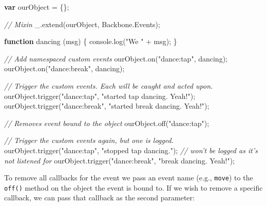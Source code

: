 \documentclass[9pt]{book}
\newenvironment{Shaded}{}{}
\newcommand{\KeywordTok}[1]{\textcolor[rgb]{0.00,0.44,0.13}{\textbf{{#1}}}}
\newcommand{\StringTok}[1]{\textcolor[rgb]{0.25,0.44,0.63}{{#1}}}
\newcommand{\CommentTok}[1]{\textcolor[rgb]{0.38,0.63,0.69}{\textit{{#1}}}}
\newcommand{\OtherTok}[1]{\textcolor[rgb]{0.00,0.44,0.13}{{#1}}}
\newcommand{\FunctionTok}[1]{\textcolor[rgb]{0.02,0.16,0.49}{{#1}}}
\newcommand{\NormalTok}[1]{{#1}}
\begin{document}
\begin{Shaded}
\begin{Highlighting}[]
\KeywordTok{var} \NormalTok{ourObject = \{\};}

\CommentTok{// Mixin}
\OtherTok{_}\NormalTok{.}\FunctionTok{extend}\NormalTok{(ourObject, }\OtherTok{Backbone}\NormalTok{.}\FunctionTok{Events}\NormalTok{);}

\KeywordTok{function} \FunctionTok{dancing} \NormalTok{(msg) \{ }\OtherTok{console}\NormalTok{.}\FunctionTok{log}\NormalTok{(}\StringTok{"We "} \NormalTok{+ msg); \}}

\CommentTok{// Add namespaced custom events}
\OtherTok{ourObject}\NormalTok{.}\FunctionTok{on}\NormalTok{(}\StringTok{"dance:tap"}\NormalTok{, dancing);}
\OtherTok{ourObject}\NormalTok{.}\FunctionTok{on}\NormalTok{(}\StringTok{"dance:break"}\NormalTok{, dancing);}

\CommentTok{// Trigger the custom events. Each will be caught and acted upon.}
\OtherTok{ourObject}\NormalTok{.}\FunctionTok{trigger}\NormalTok{(}\StringTok{"dance:tap"}\NormalTok{, }\StringTok{"started tap dancing. Yeah!"}\NormalTok{);}
\OtherTok{ourObject}\NormalTok{.}\FunctionTok{trigger}\NormalTok{(}\StringTok{"dance:break"}\NormalTok{, }\StringTok{"started break dancing. Yeah!"}\NormalTok{);}

\CommentTok{// Removes event bound to the object}
\OtherTok{ourObject}\NormalTok{.}\FunctionTok{off}\NormalTok{(}\StringTok{"dance:tap"}\NormalTok{);}

\CommentTok{// Trigger the custom events again, but one is logged.}
\OtherTok{ourObject}\NormalTok{.}\FunctionTok{trigger}\NormalTok{(}\StringTok{"dance:tap"}\NormalTok{, }\StringTok{"stopped tap dancing."}\NormalTok{); }\CommentTok{// won't be logged as it's not listened for}
\OtherTok{ourObject}\NormalTok{.}\FunctionTok{trigger}\NormalTok{(}\StringTok{"dance:break"}\NormalTok{, }\StringTok{"break dancing. Yeah!"}\NormalTok{);}
\end{Highlighting}
\end{Shaded}

To remove all callbacks for the event we pass an event name (e.g.,
\texttt{move}) to the \texttt{off()} method on the object the event is
bound to. If we wish to remove a specific callback, we can pass that
callback as the second parameter:
\end{document}
